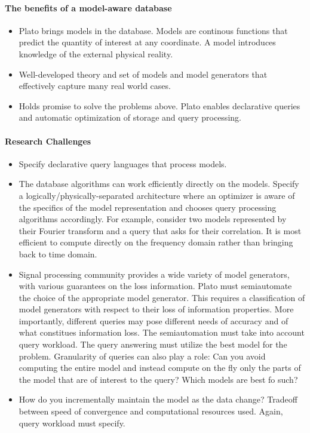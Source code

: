 \paragraph{The benefits of a model-aware database}

\begin{itemize}
%
\item Plato brings models in the database. Models are continous functions that predict the quantity of interest at any coordinate. A model introduces knowledge of the external physical reality.
%
\item Well-developed theory and set of models and model generators that effectively capture many real world cases.
%
\item Holds promise to solve the problems above. Plato enables declarative queries and automatic optimization of storage and query processing.
%
\end{itemize}

\paragraph{Research Challenges}
\begin{itemize}
%
\item Specify declarative query languages that process models.
%
\item The database algorithms can work efficiently directly on the models. Specify a logically/physically-separated architecture where an optimizer is aware of the specifics of the model representation and chooses query processing algorithms accordingly.  For example, consider two models represented by their Fourier transform and a query that asks for their correlation. It is most efficient to compute directly on the frequency domain rather than bringing back to time domain.
%
\item Signal processing community provides a wide variety of model generators, with various guarantees on the loss information. Plato must semiautomate the choice of the appropriate model generator. This requires a classification of model generators with respect to their loss of information properties. More importantly, different queries may pose different needs of accuracy and of what constitues information loss. The semiautomation must take into account query workload. The query answering must utilize the best model for the problem. Granularity of queries can also play a role: Can you avoid computing the entire model and instead compute on the fly only the parts of the model that are of interest to the query? Which models are best fo such?
%
\item How do you incrementally maintain the model as the data change? Tradeoff between speed of convergence and computational resources used. Again, query workload must specify.
\end{itemize}

